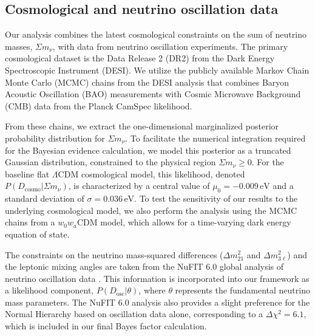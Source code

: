 \documentclass[]{article}
\begin{document}
\subsection{Cosmological and neutrino oscillation data}
Our analysis combines the latest cosmological constraints on the sum of neutrino masses, $\Sigma m_\nu$, with data from neutrino oscillation experiments. The primary cosmological dataset is the Data Release 2 (DR2) from the Dark Energy Spectroscopic Instrument (DESI). We utilize the publicly available Markov Chain Monte Carlo (MCMC) chains from the DESI analysis that combines Baryon Acoustic Oscillation (BAO) measurements with Cosmic Microwave Background (CMB) data from the Planck CamSpec likelihood.

From these chains, we extract the one-dimensional marginalized posterior probability distribution for $\Sigma m_\nu$. To facilitate the numerical integration required for the Bayesian evidence calculation, we model this posterior as a truncated Gaussian distribution, constrained to the physical region $\Sigma m_\nu \ge 0$. For the baseline flat $\Lambda$CDM cosmological model, this likelihood, denoted $P(D_{\text{cosmo}}|\Sigma m_\nu)$, is characterized by a central value of $\mu_0 = -0.009\,\text{eV}$ and a standard deviation of $\sigma = 0.036\,\text{eV}$. To test the sensitivity of our results to the underlying cosmological model, we also perform the analysis using the MCMC chains from a $w_0w_a$CDM model, which allows for a time-varying dark energy equation of state.

The constraints on the neutrino mass-squared differences ($\Delta m^2_{21}$ and $\Delta m^2_{3\ell}$) and the leptonic mixing angles are taken from the NuFIT 6.0 global analysis of neutrino oscillation data \citep{alikhanov2026relationneutrinomasssquareddifferences}. This information is incorporated into our framework as a likelihood component, $P(D_{\text{osc}}|\theta)$, where $\theta$ represents the fundamental neutrino mass parameters. The NuFIT 6.0 analysis also provides a slight preference for the Normal Hierarchy based on oscillation data alone, corresponding to a $\Delta\chi^2 = 6.1$, which is included in our final Bayes factor calculation.
\end{document}
